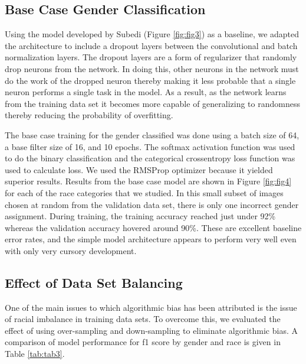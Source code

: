 \documentclass[obeyspaces, spaces, fleqn,10pt]{SelfArx} %
\begin{document}
\subsection{Base Case Gender Classification}
Using the model developed by Subedi (Figure \ref{fig:fig3}) as a baseline, we adapted the architecture to include a dropout layers between the convolutional and batch normalization layers. The dropout layers are a form of regularizer that randomly drop neurons from the network. In doing this, other neurons in the network must do the work of the dropped neuron thereby making it less probable that a single neuron performs a single task in the model. As a result, as the network learns from the training data set it becomes more capable of generalizing to randomness thereby reducing the probability of overfitting.

The base case training for the gender classified was done using a batch size of 64, a base filter size of 16, and 10 epochs. The softmax activation function was used to do the binary classification and the categorical crossentropy loss function was used to calculate loss. We used the RMSProp optimizer because it yielded superior results. Results from the base case model are shown in Figure \ref{fig:fig4} for each of the race categories that we studied. In this small subset of images chosen at random from the validation data set, there is only one incorrect gender assignment. During training, the training accuracy reached just under 92\% whereas the validation accuracy hovered around 90\%. These are excellent baseline error rates, and the simple model architecture appears to perform very well even with only very cursory development. 

\subsection{Effect of Data Set Balancing}

One of the main issues to which algorithmic bias has been attributed is the issue of racial imbalance in training data sets. To overcome this, we evaluated the effect of using over-sampling and down-sampling to eliminate algorithmic bias. A comparison of model performance for f1 score by gender and race is given in Table \ref{tab:tab3}.
\end{document}
